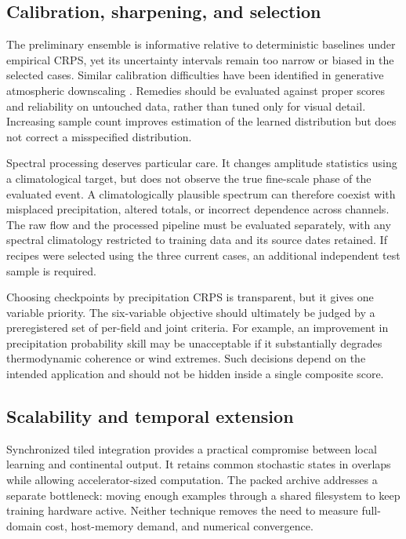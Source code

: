 \documentclass[10pt]{article}
\begin{document}
\subsection{Calibration, sharpening, and selection}
The preliminary ensemble is informative relative to deterministic baselines under empirical CRPS, yet its uncertainty intervals remain too narrow or biased in the selected cases. Similar calibration difficulties have been identified in generative atmospheric downscaling \citep{mardani2025}. Remedies should be evaluated against proper scores and reliability on untouched data, rather than tuned only for visual detail. Increasing sample count improves estimation of the learned distribution but does not correct a misspecified distribution.

Spectral processing deserves particular care. It changes amplitude statistics using a climatological target, but does not observe the true fine-scale phase of the evaluated event. A climatologically plausible spectrum can therefore coexist with misplaced precipitation, altered totals, or incorrect dependence across channels. The raw flow and the processed pipeline must be evaluated separately, with any spectral climatology restricted to training data and its source dates retained. If recipes were selected using the three current cases, an additional independent test sample is required.

Choosing checkpoints by precipitation CRPS is transparent, but it gives one variable priority. The six-variable objective should ultimately be judged by a preregistered set of per-field and joint criteria. For example, an improvement in precipitation probability skill may be unacceptable if it substantially degrades thermodynamic coherence or wind extremes. Such decisions depend on the intended application and should not be hidden inside a single composite score.

\subsection{Scalability and temporal extension}
Synchronized tiled integration provides a practical compromise between local learning and continental output. It retains common stochastic states in overlaps while allowing accelerator-sized computation. The packed archive addresses a separate bottleneck: moving enough examples through a shared filesystem to keep training hardware active. Neither technique removes the need to measure full-domain cost, host-memory demand, and numerical convergence.
\end{document}
